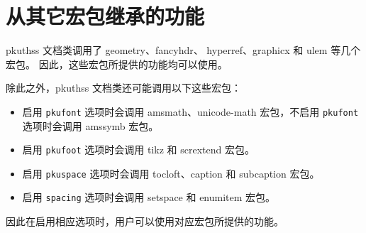 \section{从其它宏包继承的功能}
\label{sec:thirdparty}

pkuthss 文档类调用了 geometry\cite{geometry}、fancyhdr\cite{fancyhdr}、%
hyperref\cite{hyperref}、graphicx\cite{graphicx}
和 ulem\cite{ulem} 等几个宏包。
因此，这些宏包所提供的功能均可以使用。

除此之外，pkuthss 文档类还可能调用以下这些宏包：
\begin{itemize}
    \item 启用 \verb|pkufont| 选项时会调用 amsmath、unicode-math
        \cite{unicode-math} 宏包，不启用
        \verb|pkufont| 选项时会调用 amssymb\cite{amssymb} 宏包。
    \item 启用 \verb|pkufoot| 选项时会调用
        tikz\cite{tikz} 和 scrextend\cite{scrextend} 宏包。
    \item 启用 \verb|pkuspace| 选项时会调用
        tocloft\cite{tocloft}、caption\cite{caption} 和
        subcaption\cite{subcaption} 宏包。
    \item 启用 \verb|spacing| 选项时会调用 setspace 和
        enumitem\cite{enumitem} 宏包。
\end{itemize}
因此在启用相应选项时，用户可以使用对应宏包所提供的功能。
